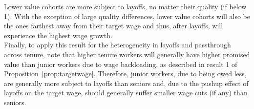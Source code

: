 Lower value cohorts are more subject to layoffs, no matter their quality (if below 1). With the exception of large quality differences, lower value cohorts will also be the ones farthest away from their target wage and thus, after layoffs, will experience the highest wage growth. \\
Finally, to apply this result for the heterogeneity in layoffs and passthrough across tenure, note that higher tenure workers will generally have higher promised value than junior workers due to wage backloading, as described in result 1 of Proposition~\ref{prop:targetwage}. Therefore, junior workers, due to being owed less, are generally more subject to layoffs than seniors and, due to the pushup effect of layoffs on the target wage, should generally suffer smaller wage cuts (if any) than seniors.